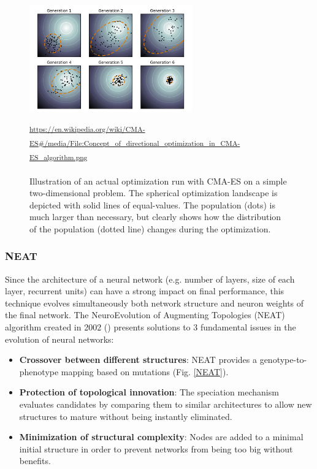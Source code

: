 \begin{figure}[H]
 \centering
 \captionsetup{justification=centering, margin=0.5cm}
 \includegraphics[width=7cm]{images/CMA_ES.png}
 \caption{\label{CMA-ES}Illustration of an actual optimization run with CMA-ES on a simple two-dimensional problem. The spherical optimization landscape is depicted with solid lines of equal-values. The population (dots) is much larger than necessary, but clearly shows how the distribution of the population (dotted line) changes during the optimization.}
\small\textsuperscript{\url{https://en.wikipedia.org/wiki/CMA-ES#/media/File:Concept_of_directional_optimization_in_CMA-ES_algorithm.png}}
 \label{CMA-ES}
\end{figure}

\bigbreak

\subsubsection{NEAT}
Since the architecture of a neural network (e.g. number of layers, size of each layer, recurrent units) can have a strong impact on final performance, this technique evolves simultaneously both network structure and neuron weights of the final network. The NeuroEvolution of Augmenting Topologies (NEAT) algorithm created in 2002 (\cite{NEAT_1, NEAT_2}) presents solutions to 3 fundamental issues in the evolution of neural networks:

\begin{itemize}
    \item \textbf{Crossover between different structures}: NEAT provides a genotype-to-phenotype mapping based on mutations (Fig. \ref{NEAT}).
    \item \textbf{Protection of topological innovation}: The speciation mechanism evaluates candidates by comparing them to similar architectures to allow new structures to mature without being instantly eliminated. 
    \item \textbf{Minimization of structural complexity}: Nodes are added to a minimal initial structure in order to prevent networks from being too big without benefits.
\end{itemize}
\bigbreak

